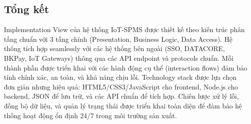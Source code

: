 \subsection{Tổng kết}

Implementation View của hệ thống IoT-SPMS được thiết kế theo kiến trúc phân tầng chuẩn với 3 tầng chính (Presentation, Business Logic, Data Access). Hệ thống tích hợp seamlessly với các hệ thống bên ngoài (SSO, DATACORE, BKPay, IoT Gateways) thông qua các API endpoint và protocols chuẩn. Mỗi thành phần được triển khai với các hành động cụ thể (interaction flows) đảm bảo tính chính xác, an toàn, và khả năng chịu lỗi. Technology stack được lựa chọn đơn giản nhưng hiệu quả: HTML5/CSS3/JavaScript cho frontend, Node.js cho backend, JSON để lưu trữ, và các API chuẩn để tích hợp. Chiến lược xử lý lỗi, đồng bộ dữ liệu, và quản lý trạng thái được triển khai toàn diện để đảm bảo hệ thống hoạt động ổn định 24/7 trong môi trường sản xuất.
